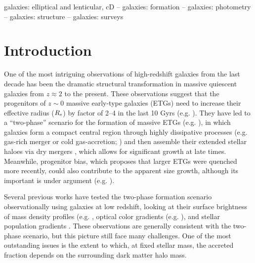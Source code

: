 \documentclass[a4paper,fleqn,usenatbib]{mnras}
\begin{document}
\begin{keywords}
    galaxies: elliptical and lenticular, cD --
    galaxies: formation --
    galaxies: photometry -- 
    galaxies: structure -- 
    galaxies: surveys
\end{keywords}





\section{Introduction}
    \label{sec:intro}
    
    One of the most intriguing observations of high-redshift galaxies from the last 
    decade has been the dramatic structural transformation in massive quiescent 
    galaxies \citep[e.g.][]{Trujillo2006, vanDokkum2008, Cimatti2008, Damjanov2009, 
    vanderWel2011, Szomoru2012, Patel2013} from $z \approx 2$ to the present. 
    These observations suggest that the progenitors of $z{\sim} 0$ massive early-type 
    galaxies (ETGs) need to increase their effective radius ($R_{\rm e}$) by factor 
    of 2--4 in the last 10 Gyrs (e.g. \citealt{Newman2012, vdWel2014}).
    They have led to a ``two-phase'' scenario for the formation of massive ETGs 
    (e.g. \citealt{Oser2010, Oser2012}),
    in which galaxies form a compact central region through highly dissipative 
    processes (e.g. gas-rich merger or cold gas-accretion; 
    \citealt{Hopkins2008, Dekel2009}) and then assemble their extended stellar 
    haloes via dry mergers 
    \citep[e.g,][]{Naab2006, Khochfar2006, Oser2010, Oser2012}, which allows for 
    significant growth at late times. 
    Meanwhile, progenitor bias, which proposes that larger ETGs were quenched more 
    recently, could also contribute to the apparent size growth, although its 
    important is under argument (e.g. \citealt{Newman2012, Carollo2013, 
    Poggianti2013, Belli2015, Keating2015, Fagioli2016}). 
    
    Several previous works have tested the two-phase formation scenario 
    observationally using galaxies at low redshift, looking at their surface 
    brightness of mass density profiles (e.g. \citealt{Huang2013a, Huang2013b, 
    Oh2017}, optical color gradients (e.g. \citealt{LaBarbera2010, LaBarbera2012}), 
    and stellar population gradients \citep[e.g.,][]{Coccato2010, Coccato2011, 
    Greene2015, Barbosa2016}. 
    These observations are generally consistent with the two-phase scenario, 
    but this picture still face many challenges.
    One of the most outstanding issues is the extent to which, at fixed stellar mass, 
    the accreted fraction depends on the surrounding dark matter halo mass. 
    
\end{document}
